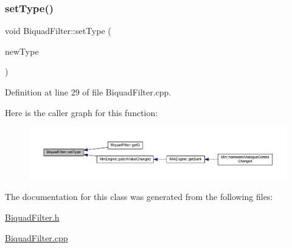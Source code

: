 \subsubsection{\texorpdfstring{set\+Type()}{setType()}}
{\footnotesize\ttfamily void Biquad\+Filter\+::set\+Type (\begin{DoxyParamCaption}\item[{\hyperlink{class_biquad_filter_a173337ea2d17607e19495cf7b91f1110}{Biquad\+Filter\+::\+Filt\+Type}}]{new\+Type }\end{DoxyParamCaption})}



Definition at line 29 of file Biquad\+Filter.\+cpp.

Here is the caller graph for this function\+:
\nopagebreak
\begin{figure}[H]
\begin{center}
\leavevmode
\includegraphics[width=350pt]{class_biquad_filter_af31a36e9f121facbabf87d303642d4e2_icgraph}
\end{center}
\end{figure}


The documentation for this class was generated from the following files\+:\begin{DoxyCompactItemize}
\item 
\hyperlink{_biquad_filter_8h}{Biquad\+Filter.\+h}\item 
\hyperlink{_biquad_filter_8cpp}{Biquad\+Filter.\+cpp}\end{DoxyCompactItemize}
